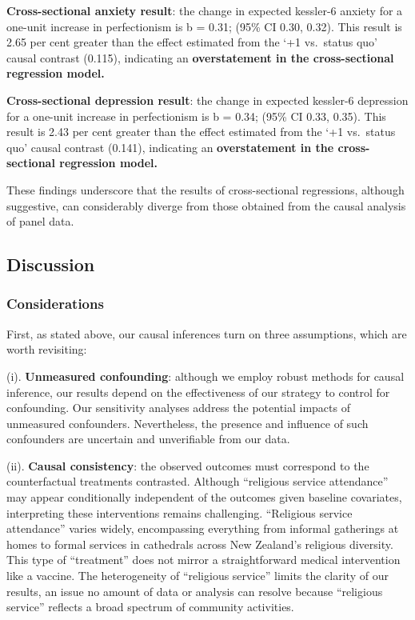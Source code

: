 \documentclass[
  single column]{article}
\begin{document}
\textbf{Cross-sectional anxiety result}: the change in expected
kessler-6 anxiety for a one-unit increase in perfectionism is b = 0.31;
(95\% CI 0.30, 0.32). This result is 2.65 per cent greater than the
effect estimated from the `+1 vs.~status quo' causal contrast (0.115),
indicating an \textbf{overstatement in the cross-sectional regression
model.}

\textbf{Cross-sectional depression result}: the change in expected
kessler-6 depression for a one-unit increase in perfectionism is b =
0.34; (95\% CI 0.33, 0.35). This result is 2.43 per cent greater than
the effect estimated from the `+1 vs.~status quo' causal contrast
(0.141), indicating an \textbf{overstatement in the cross-sectional
regression model.}

These findings underscore that the results of cross-sectional
regressions, although suggestive, can considerably diverge from those
obtained from the causal analysis of panel data.

\newpage{}

\subsection{Discussion}\label{discussion}

\subsubsection{Considerations}\label{considerations}

First, as stated above, our causal inferences turn on three assumptions,
which are worth revisiting:

(i). \textbf{Unmeasured confounding}: although we employ robust methods
for causal inference, our results depend on the effectiveness of our
strategy to control for confounding. Our sensitivity analyses address
the potential impacts of unmeasured confounders. Nevertheless, the
presence and influence of such confounders are uncertain and
unverifiable from our data.

(ii). \textbf{Causal consistency}: the observed outcomes must correspond
to the counterfactual treatments contrasted. Although ``religious
service attendance'' may appear conditionally independent of the
outcomes given baseline covariates, interpreting these interventions
remains challenging. ``Religious service attendance'' varies widely,
encompassing everything from informal gatherings at homes to formal
services in cathedrals across New Zealand's religious diversity. This
type of ``treatment'' does not mirror a straightforward medical
intervention like a vaccine. The heterogeneity of ``religious service''
limits the clarity of our results, an issue no amount of data or
analysis can resolve because ``religious service'' reflects a broad
spectrum of community activities.
\end{document}
